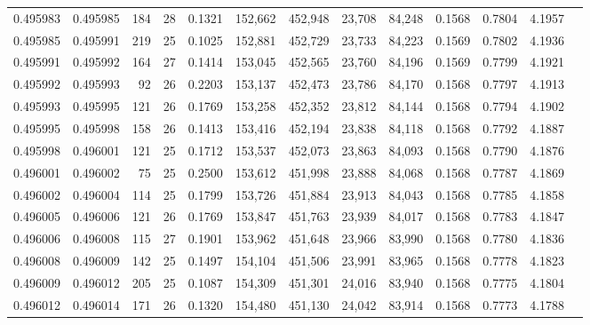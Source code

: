 \begin{tabular}{rrrrrrrrrrrrr}
0.495983 & 0.495985 & 184 &  28 &                                     0.1321 & 152,662 & 452,948 &  23,708 &  84,248 & 0.1568 & 0.7804 & 4.1957 \\
0.495985 & 0.495991 & 219 &  25 &                                     0.1025 & 152,881 & 452,729 &  23,733 &  84,223 & 0.1569 & 0.7802 & 4.1936 \\
0.495991 & 0.495992 & 164 &  27 &                                     0.1414 & 153,045 & 452,565 &  23,760 &  84,196 & 0.1569 & 0.7799 & 4.1921 \\
0.495992 & 0.495993 &  92 &  26 &                                     0.2203 & 153,137 & 452,473 &  23,786 &  84,170 & 0.1568 & 0.7797 & 4.1913 \\
0.495993 & 0.495995 & 121 &  26 &                                     0.1769 & 153,258 & 452,352 &  23,812 &  84,144 & 0.1568 & 0.7794 & 4.1902 \\
0.495995 & 0.495998 & 158 &  26 &                                     0.1413 & 153,416 & 452,194 &  23,838 &  84,118 & 0.1568 & 0.7792 & 4.1887 \\
0.495998 & 0.496001 & 121 &  25 &                                     0.1712 & 153,537 & 452,073 &  23,863 &  84,093 & 0.1568 & 0.7790 & 4.1876 \\
0.496001 & 0.496002 &  75 &  25 &                                     0.2500 & 153,612 & 451,998 &  23,888 &  84,068 & 0.1568 & 0.7787 & 4.1869 \\
0.496002 & 0.496004 & 114 &  25 &                                     0.1799 & 153,726 & 451,884 &  23,913 &  84,043 & 0.1568 & 0.7785 & 4.1858 \\
0.496005 & 0.496006 & 121 &  26 &                                     0.1769 & 153,847 & 451,763 &  23,939 &  84,017 & 0.1568 & 0.7783 & 4.1847 \\
0.496006 & 0.496008 & 115 &  27 &                                     0.1901 & 153,962 & 451,648 &  23,966 &  83,990 & 0.1568 & 0.7780 & 4.1836 \\
0.496008 & 0.496009 & 142 &  25 &                                     0.1497 & 154,104 & 451,506 &  23,991 &  83,965 & 0.1568 & 0.7778 & 4.1823 \\
0.496009 & 0.496012 & 205 &  25 &                                     0.1087 & 154,309 & 451,301 &  24,016 &  83,940 & 0.1568 & 0.7775 & 4.1804 \\
0.496012 & 0.496014 & 171 &  26 &                                     0.1320 & 154,480 & 451,130 &  24,042 &  83,914 & 0.1568 & 0.7773 & 4.1788 \\

\end{tabular}
